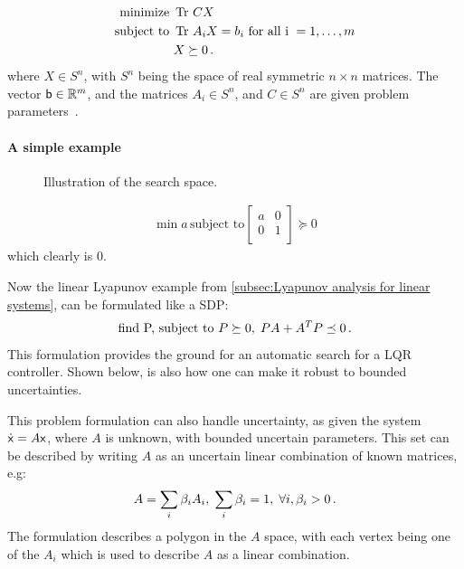 \begin{align*}
  \text{minimize } &\operatorname{Tr}\,CX \\
  \text{subject to } &\operatorname{Tr}\,A_{i}X = b_{i} \text{ for all i } = 1,\ldots,m \\
                   &X \succeq 0 \, .
\end{align*} 
where \(X \in S^n\), with \(S^n\) being the space of real symmetric \(n \times
n\) matrices. The vector \({\mathbf{\mathsf{b}}} \in \mathbb{R}^m\), and the matrices \(A_i \in
S^n\), and \(C \in S^n\) are given problem
parameters~\cite{wolkowiczHandbookSemidefiniteProgramming2000}.

\paragraph{A simple example}
\label{subsec:A simple example}

\begin{figure}
  \centering
  
  \caption[An illustration of the linear search space]{Illustration of the search space.}
\end{figure}

\begin{align*}
  \min{a}\, \text{subject to}
  \begin{bmatrix}
    a & 0 \\
    0 & 1 \\
  \end{bmatrix}
  \succeq 0
\end{align*}
which clearly is \(0\).

Now the linear Lyapunov example from \cref{subsec:Lyapunov analysis for linear
  systems}, can be formulated like a \ac{SDP}:
\begin{align*}
  \text{find P, subject to } P \succeq 0, \; PA + A^{T}P \preceq 0 \, .
\end{align*}
This formulation provides the ground for an automatic search for a
\ac{LQR} controller. Shown below, is also how one can make it robust to bounded
uncertainties.

This problem formulation can also handle uncertainty, as given the system
\(\dot{{\mathbf{\mathsf{x}}}} = A{\mathbf{\mathsf{x}}}\), where \(A\) is unknown, with bounded uncertain
parameters. This set can be described by writing \(A\) as an uncertain linear
combination of known matrices, e.g:
\[
  A = \sum_{i} \beta_{i}A_{i}, \; \sum_{i}\beta_{i} = 1, \; \forall i,\beta_{i}
  > 0 \, .
\]
The formulation describes a polygon in the \(A\) space, with each vertex being
one of the \(A_{i}\) which is used to describe \(A\) as a linear combination.

